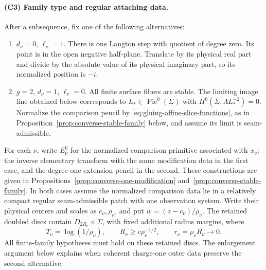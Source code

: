 \documentclass[11pt]{amsart}
\theoremstyle{definition}
\theoremstyle{remark}
\theoremstyle{plain}
\begin{document}
\paragraph{(C3) Family type and regular attaching data.}
After a subsequence, fix one of the following alternatives:
\begin{enumerate}
\item $d_\nu=0$, $\ell_\nu=1$. There is one Langton step with quotient
of degree zero. Its point is in the open negative half-plane. Translate
by its physical real part and divide by the absolute value of its
physical imaginary part, so its normalized position is $-i$.
\item $g=2$, $d_\nu=1$, $\ell_\nu=0$. All finite surface fibers are
stable. The limiting image line obtained below corresponds to
$L_*\in\operatorname{Pic}^0(\Sigma)$ with
$H^0(\Sigma,\Lambda L_*^{-2})=0$. Normalize the comparison
pencil by \eqref{eq:gluing-affine-slice-functions}, as in
Proposition~\ref{prop:converse-stable-family} below, and assume its
limit is seam-admissible.
\end{enumerate}
For each $\nu$, write $E_\nu^0$ for the normalized comparison
primitive associated with $x_\nu$: the inverse elementary transform
with the same modification data in the first case, and the
degree-one extension pencil in the second. These constructions
are given in Propositions~\ref{prop:converse-one-modification}
and~\ref{prop:converse-stable-family}.
In both cases assume the normalized comparison data lie in a
relatively compact regular seam-admissible patch with one observation
system. Write their physical centers and scales as $c_\nu,\rho_\nu$,
and put $w=(z-c_\nu)/\rho_\nu$. The retained doubled discs contain
$D_{2R_\nu}\times\Sigma$, with fixed additional radius margins, where
\begin{equation}\label{eq:converse-radii}
 T_\nu=\log(1/\rho_\nu),\qquad
 R_\nu\geq c\rho_\nu^{-1/2},\qquad
 r_\nu=\rho_\nu R_\nu\longrightarrow0.
\end{equation}
All finite-family hypotheses must hold on these retained discs.
The enlargement argument below explains when coherent charge-one
outer data preserve the second alternative.
\end{document}
